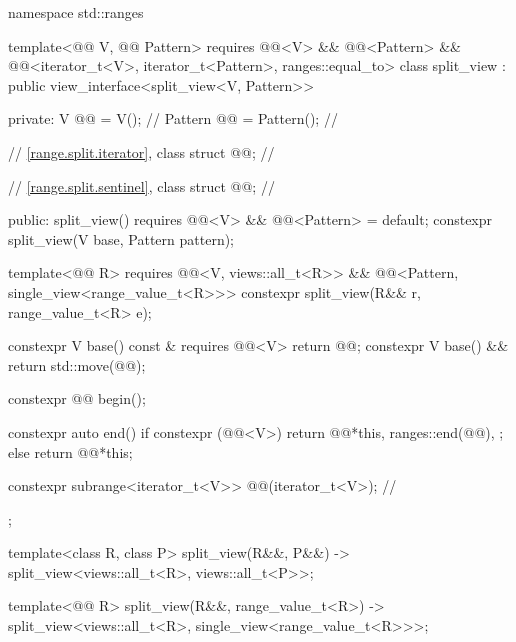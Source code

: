 \begin{codeblock}
namespace std::ranges {
  template<@@ V, @@ Pattern>
    requires @@<V> && @@<Pattern> &&
             @@<iterator_t<V>, iterator_t<Pattern>, ranges::equal_to>
  class split_view : public view_interface<split_view<V, Pattern>> {
  private:
    V @@ = V();                              // \expos
    Pattern @@ = Pattern();               // \expos

    // \ref{range.split.iterator}, class 
    struct @@;                            // \expos

    // \ref{range.split.sentinel}, class 
    struct @@;                            // \expos

  public:
    split_view()
      requires @@<V> && @@<Pattern> = default;
    constexpr split_view(V base, Pattern pattern);

    template<@@ R>
      requires @@<V, views::all_t<R>> &&
               @@<Pattern, single_view<range_value_t<R>>>
    constexpr split_view(R&& r, range_value_t<R> e);

    constexpr V base() const & requires @@<V> { return @@; }
    constexpr V base() && { return std::move(@@); }

    constexpr @@ begin();

    constexpr auto end() {
      if constexpr (@@<V>) {
        return @@{*this, ranges::end(@@), {}};
      } else {
        return @@{*this};
      }
    }

    constexpr subrange<iterator_t<V>> @@(iterator_t<V>); // \expos
  };

  template<class R, class P>
    split_view(R&&, P&&) -> split_view<views::all_t<R>, views::all_t<P>>;

  template<@@ R>
    split_view(R&&, range_value_t<R>)
      -> split_view<views::all_t<R>, single_view<range_value_t<R>>>;
}
\end{codeblock}


